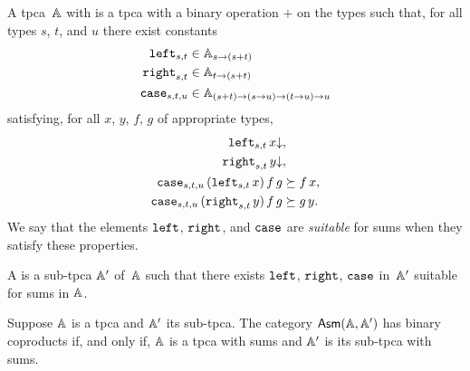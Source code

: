 \begin{definition}
  A tpca~$\AA$ with  is a tpca with a binary operation $+$
  on the types such that, for all types $s$, $t$, and $u$ there exist
  constants
  \begin{align*}
    \combLeft_{s,t} &\in \Atyp{s \to (s + t)} \\
    \combRight_{s,t} &\in \Atyp{t \to (s + t)} \\
    \combCase_{s,t,u} &\in \Atyp{(s + t) \to (s \to u) \to (t \to u) \to u}
  \end{align*}
  satisfying, for all $x$, $y$, $f$, $g$ of appropriate types,
  \begin{align*}
    \defined{\combLeft_{s,t}\,x} &, \\
    \defined{\combRight_{s,t}\,y} &,\\
    \combCase_{s,t,u}\,(\combLeft_{s,t}\,x)\,f\,g &\klgeq f\,x, \\
    \combCase_{s,t,u}\,(\combRight_{s,t}\,y)\,f\,g &\klgeq g\,y.
  \end{align*}
  We say that the elements $\combLeft$, $\combRight$, and $\combCase$
  are \emph{suitable} for sums when they satisfy these properties.

  A  is a sub-tpca $\subAA$ of~$\AA$ such
  that there exists $\combLeft$, $\combRight$, $\combCase$
  in~$\subAA$ suitable for sums in $\AA$.
\end{definition}

\begin{proposition}
  \label{prop:asm-coproducts-iff-tpca-sums}
  Suppose $\AA$ is a tpca and $\subAA$ its sub-tpca. The category
  $\AsmA$ has binary coproducts if, and only if, $\AA$ is a tpca with
  sums and $\subAA$ is its sub-tpca with sums.
\end{proposition}

